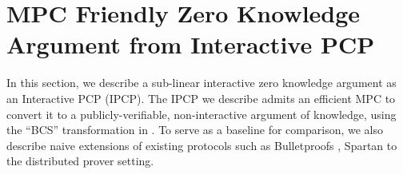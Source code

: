 \section{MPC Friendly Zero Knowledge Argument from Interactive PCP}
In this section, we describe a sub-linear interactive zero knowledge argument as
an Interactive PCP (IPCP). The IPCP we describe admits an efficient MPC to
convert it to a publicly-verifiable, non-interactive argument of knowledge,
using the ``BCS'' transformation in \cite{BCS16}.  To serve as a
baseline for comparison, we also describe naive extensions of existing protocols
such as Bulletproofs \cite{bulletproofs}, Spartan \cite{spartan} to the
distributed prover setting. 

